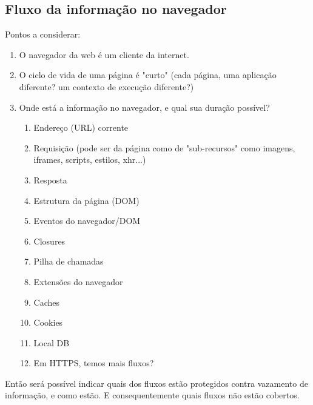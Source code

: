 \subsection{Fluxo da informação no navegador}
\begin{todo}
Pontos a considerar:

\begin{enumerate}
	\item O navegador da web é um cliente da internet.
	\item O ciclo de vida de uma página é "curto" (cada página, uma aplicação diferente? um contexto de execução diferente?)
	\item Onde está a informação no navegador, e qual sua duração possível?
	\begin{enumerate}
		\item Endereço (URL) corrente
		\item Requisição (pode ser da página como de "sub-recursos" como imagens, iframes, scripts, estilos, xhr...)
		\item Resposta
		\item Estrutura da página (DOM)
		\item Eventos do navegador/DOM
		\item Closures
		\item Pilha de chamadas
		\item Extensões do navegador
		\item Caches
		\item Cookies
		\item Local DB
		\item Em HTTPS, temos mais fluxos?
	\end{enumerate}
\end{enumerate}

Então será possível indicar quais dos fluxos estão protegidos contra vazamento de informação, e como estão. E consequentemente quais fluxos não estão cobertos.
\end{todo}
